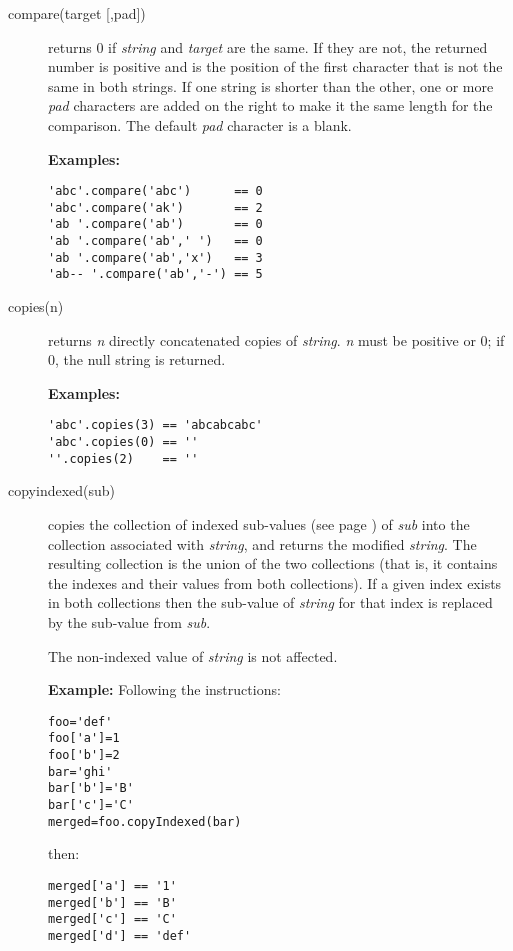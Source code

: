 \begin{description}
\item[compare(target [,pad{]})]\label{refcompar}

returns 0 if \emph{string} and \emph{target}
are the same.
If they are not, the returned number is positive and is the position of
the first character that is not the same in both strings.
If one string is shorter than the other, one or more \emph{pad}
characters are added on the right to make it the same length for the
comparison.
The default \emph{pad} character is a blank.
 
\textbf{Examples:}
\begin{lstlisting}
'abc'.compare('abc')      == 0
'abc'.compare('ak')       == 2
'ab '.compare('ab')       == 0
'ab '.compare('ab',' ')   == 0
'ab '.compare('ab','x')   == 3
'ab-- '.compare('ab','-') == 5
\end{lstlisting}
\item[copies(n)]\label{refcopies}
returns \emph{n} directly concatenated copies of
\emph{string}.
\emph{n} must be positive or 0; if 0, the null string is returned.
 
\textbf{Examples:}
\begin{lstlisting}
'abc'.copies(3) == 'abcabcabc'
'abc'.copies(0) == ''
''.copies(2)    == ''
\end{lstlisting}
\item[copyindexed(sub)]\label{refcopyind}
copies the collection of indexed  sub-values (see page \pageref{refinstr}) 
of \emph{sub} into the collection associated with
\emph{string}, and returns the modified \emph{string}.  The
resulting collection is the union of the two collections (that is,
it contains the indexes and their values from both collections).
If a given index exists in both collections then the sub-value of
\emph{string} for that index is replaced by the sub-value from
\emph{sub}.
 
The non-indexed value of \emph{string} is not affected.
 
\textbf{Example:}
 Following the instructions:
\begin{lstlisting}
foo='def'
foo['a']=1
foo['b']=2
bar='ghi'
bar['b']='B'
bar['c']='C'
merged=foo.copyIndexed(bar)
\end{lstlisting}
then:
\begin{lstlisting}
merged['a'] == '1'
merged['b'] == 'B'
merged['c'] == 'C'
merged['d'] == 'def'
\end{lstlisting}



\end{description}
